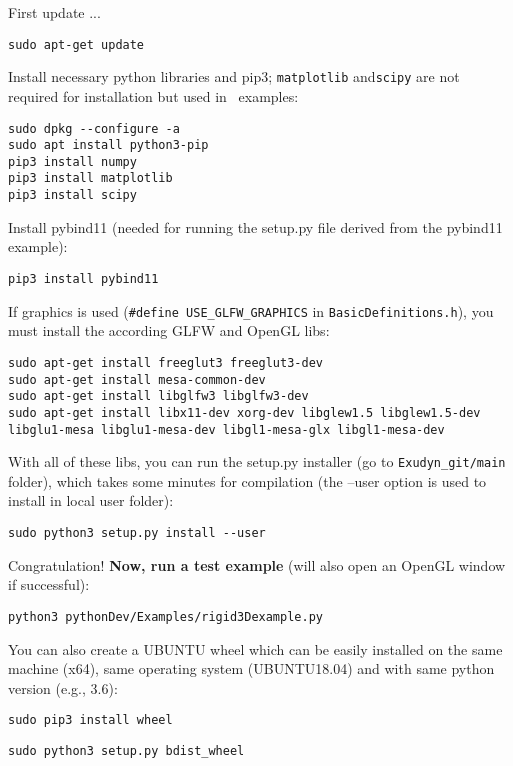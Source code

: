 \noindent First update ...
\begin{lstlisting}[firstnumber=1]
sudo apt-get update
\end{lstlisting}

\noindent Install necessary python libraries and pip3; \texttt{matplotlib} and\texttt{scipy} are not required for installation but used in \codeName\ examples:
\begin{lstlisting}[firstnumber=1]
sudo dpkg --configure -a
sudo apt install python3-pip
pip3 install numpy
pip3 install matplotlib
pip3 install scipy
\end{lstlisting}

\noindent Install pybind11 (needed for running the setup.py file derived from the pybind11 example):
\begin{lstlisting}[firstnumber=1]
pip3 install pybind11
\end{lstlisting}

\noindent If graphics is used (\texttt{\#define USE\_GLFW\_GRAPHICS} in \texttt{BasicDefinitions.h}), you must install the according GLFW and OpenGL libs:
\begin{lstlisting}[firstnumber=1]
sudo apt-get install freeglut3 freeglut3-dev
sudo apt-get install mesa-common-dev
sudo apt-get install libglfw3 libglfw3-dev
sudo apt-get install libx11-dev xorg-dev libglew1.5 libglew1.5-dev libglu1-mesa libglu1-mesa-dev libgl1-mesa-glx libgl1-mesa-dev
\end{lstlisting}

\noindent With all of these libs, you can run the setup.py installer (go to \texttt{Exudyn\_git/main} folder), which takes some minutes for compilation (the --user option is used to install in local user folder):
\begin{lstlisting}[firstnumber=1]
sudo python3 setup.py install --user
\end{lstlisting}

\noindent Congratulation! {\bf Now, run a test example} (will also open an OpenGL window if successful):
\bi
  \item[] \texttt{python3 pythonDev/Examples/rigid3Dexample.py}
\ei

\noindent You can also create a UBUNTU wheel which can be easily installed on the same machine (x64), same operating system (UBUNTU18.04) and with same python version (e.g., 3.6):
\bi
  \item[] \texttt{sudo pip3 install wheel}
  \item[] \texttt{sudo python3 setup.py bdist\_wheel}
\ei


